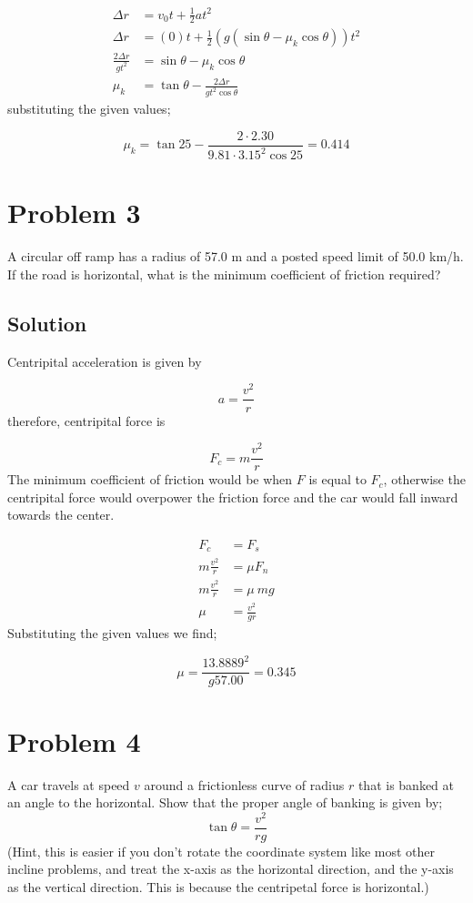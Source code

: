 \documentclass{article}
\begin{document}
\begin{align*}
	\Delta r &= v_0 t + \frac{1}{2}at^2 \\
	\Delta r &= (0) t + \frac{1}{2}\left( g\left( \sin \theta  - \mu_k \cos \theta \right) \right) t^2 \\
	\frac{2 \Delta r}{gt^2} &= \sin \theta - \mu_k \cos \theta \\
	\mu_k &= \tan \theta - \frac{2\Delta r}{gt^2\cos\theta}
\end{align*}
substituting the given values;

\[
	\mu_k = \tan25-\frac{2\cdot2.30}{9.81\cdot3.15^{2}\cos25} = \boxed{0.414}
\]

\section*{Problem 3}
A circular off ramp has a radius of 57.0 m and a posted speed limit of 50.0 km/h. If the
road is horizontal, what is the minimum coefficient of friction required?

\subsection*{Solution}
Centripital acceleration is given by

\[
	a = \frac{v^2}{r}
\]
therefore, centripital force is

\[
	F_c = m\frac{v^2}{r}
\]
The minimum coefficient of friction would be when $F$ is equal to $F_c$, otherwise the centripital force would overpower the friction force and the car would fall inward towards the center.

\begin{align*}
	F_c &= F_s \\
	m \frac{v^2}{r} &= \mu F_n \\
	m \frac{v^2}{r} &= \mu\ mg \\
	\mu &= \frac{v^2}{gr}
\end{align*}
Substituting the given values we find;

\[
	\mu = \frac{13.8889^2}{g 57.00} = \boxed{0.345}
\]

\section*{Problem 4}
A car travels at speed $v$ around a frictionless curve of radius $r$ that is banked at an angle to the horizontal. Show that the proper angle of banking is given by;
\[
	\tan \theta = \frac{v^2}{rg}
\]
(Hint, this is easier if you don’t rotate the coordinate system like most other incline problems, and treat the
x-axis as the horizontal direction, and the y-axis as the vertical direction. This is because the centripetal force is horizontal.)
\end{document}
